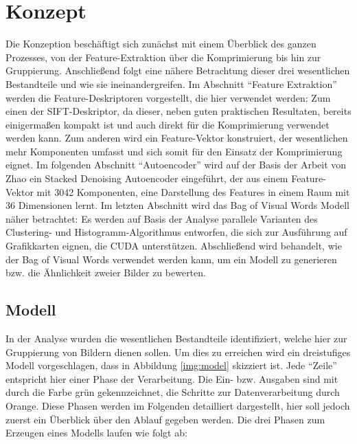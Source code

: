 \chapter{Konzept}

Die Konzeption beschäftigt sich zunächst mit einem Überblick des ganzen Prozesses, von der Feature-Extraktion über die Komprimierung bis hin zur Gruppierung. Anschließend folgt eine nähere Betrachtung dieser drei wesentlichen Bestandteile und wie sie ineinandergreifen.\newline
Im Abschnitt \enquote{Feature Extraktion} werden die Feature-Deskriptoren vorgestellt, die hier verwendet werden: Zum einen der SIFT-Deskriptor, da dieser, neben guten praktischen Resultaten, bereits einigermaßen kompakt ist und auch direkt für die Komprimierung verwendet werden kann. Zum anderen wird ein Feature-Vektor konstruiert, der wesentlichen mehr Komponenten umfasst und sich somit für den Einsatz der Komprimierung eignet.\newline
Im folgenden Abschnitt \enquote{Autoencoder} wird auf der Basis der Arbeit von Zhao \cite{aed2016} ein Stacked Denoising Autoencoder eingeführt, der aus einem Feature-Vektor mit 3042 Komponenten, eine Darstellung des Features in einem Raum mit 36 Dimensionen lernt.\newline
Im letzten Abschnitt wird das Bag of Visual Words Modell näher betrachtet: Es werden auf Basis der Analyse parallele Varianten des Clustering- und Histogramm-Algorithmus entworfen, die sich zur Ausführung auf Grafikkarten eignen, die CUDA unterstützen. Abschließend wird behandelt, wie der Bag of Visual Words verwendet werden kann, um ein Modell zu generieren bzw. die Ähnlichkeit zweier Bilder zu bewerten.

\section{Modell}

In der Analyse wurden die wesentlichen Bestandteile identifiziert, welche hier zur Gruppierung von Bildern dienen sollen. Um dies zu erreichen wird ein dreistufiges Modell vorgeschlagen, dass in Abbildung \ref{img:model} skizziert ist. Jede \enquote{Zeile} entspricht hier einer Phase der Verarbeitung. Die Ein- bzw. Ausgaben sind mit durch die Farbe grün gekennzeichnet, die Schritte zur Datenverarbeitung durch Orange. Diese Phasen werden im Folgenden detailliert dargestellt, hier soll jedoch zuerst ein Überblick über den Ablauf gegeben werden. Die drei Phasen zum Erzeugen eines Modells laufen wie folgt ab:\newline 

